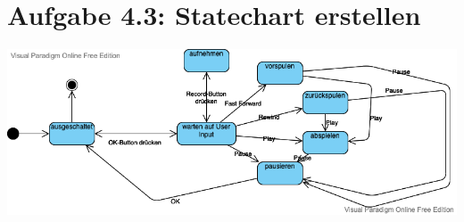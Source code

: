 \documentclass{article}
\begin{document}
 	\section*{Aufgabe 4.3: Statechart erstellen}
 	\begin{center}
 		\includegraphics[scale=0.5]{statemaschine.png}
 	\end{center}
	
\end{document}
